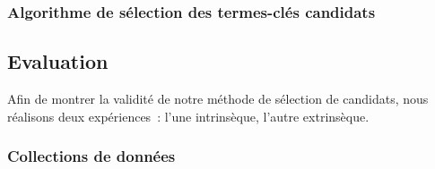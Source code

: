       \subsubsection{Algorithme de sélection des termes-clés candidats}
      \label{subsubsec:main-automatic_keyphrase_annotation-keyphrase_candidate_selection-modifiers_filtering-algorithm}

    \subsection{Evaluation}
    \label{subsec:main-automatic_keyphrase_annotation-keyphrase_candidate_selection-evaluation}
      Afin de montrer la validité de notre méthode de sélection de candidats,
      nous réalisons deux expériences~: l'une intrinsèque, l'autre extrinsèque.

      \subsubsection{Collections de données}
      \label{subsubsec:main-automatic_keyphrase_annotation-keyphrase_candidate_selection-evaluation-evaluation_data}
        \TODO{\dots}

        \begin{table}[!h]
          \centering

          \caption{Rappel des corpus utilisés pour évaluer la sélection des
                   candidats 
                   \label{tab:topicrank:corpora_recap}}
        \end{table}

